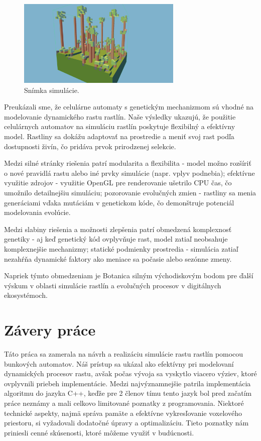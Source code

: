\documentclass[12pt]{article}
\begin{document}
\begin{figure}[ht]
	\centering
	\includegraphics[width=0.7\textwidth]{res/screenshot.png}
	\caption{Snímka simulácie.}
\end{figure}

Preukázali sme, že celulárne
automaty s genetickým mechanizmom sú vhodné na modelovanie dynamického rastu
rastlín. Naše výsledky ukazujú, že použitie celulárnych automatov na simuláciu
rastlín poskytuje flexibilný a efektívny model. Rastliny sa dokážu adaptovať
na prostredie a meniť svoj rast podľa dostupnosti živín, čo pridáva prvok
prirodzenej selekcie.

Medzi silné stránky riešenia patrí modularita a
flexibilita - model možno rozšíriť o nové pravidlá rastu alebo iné prvky
simulácie (napr. vplyv podnebia); efektívne využitie zdrojov - využitie OpenGL
pre renderovanie ušetrilo CPU čas, čo umožnilo detailnejšiu simuláciu;
pozorovanie evolučných zmien - rastliny sa menia generáciami vďaka mutáciám
v genetickom kóde, čo demonštruje potenciál modelovania evolúcie.

Medzi slabiny riešenia a možnosti zlepšenia patrí obmedzená komplexnosť
genetiky - aj keď genetický kód ovplyvňuje rast, model zatiaľ neobsahuje
komplexnejšie mechanizmy; statické podmienky prostredia - simulácia zatiaľ
nezahŕňa dynamické faktory ako meniace sa počasie alebo sezónne zmeny.

Napriek týmto obmedzeniam je Botanica silným východiskovým bodom pre ďalší
výskum v oblasti simulácie rastlín a evolučných procesov v digitálnych
ekosystémoch.

\section{Závery práce}

Táto práca sa zamerala na návrh a realizáciu simulácie rastu rastlín pomocou
bunkových automatov. Náš prístup sa ukázal ako efektívny pri modelovaní
dynamických procesov rastu, avšak počas vývoja sa vyskytlo viacero výziev,
ktoré ovplyvnili priebeh implementácie. Medzi najvýznamnejšie patrila
implementácia algoritmu do jazyka C++, keďže pre 2 členov tímu tento jazyk
bol pred začatím práce neznámy a mali celkovo limitované poznatky
z programovania. Niektoré technické aspekty, najmä správa pamäte a efektívne
vykresľovanie voxelového priestoru, si vyžadovali dodatočné úpravy
a optimalizáciu. Tieto poznatky nám priniesli cenné skúsenosti, ktoré môžeme
využiť v budúcnosti.
\end{document}
